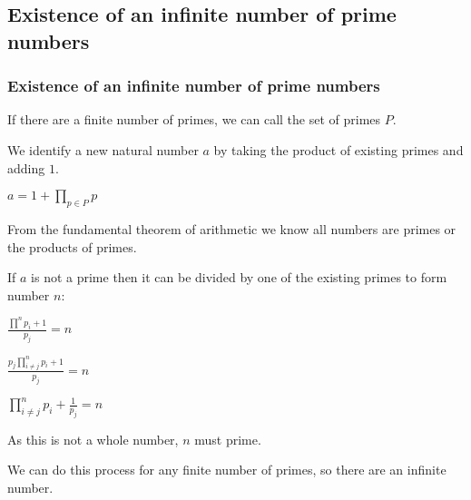 
\subsection{Existence of an infinite number of prime numbers}

\subsubsection{Existence of an infinite number of prime numbers}

If there are a finite number of primes, we can call the set of primes \(P\).

We identify a new natural number \(a\) by taking the product of existing primes and adding \(1\).

\(a=1+\prod_{p\in P} p\)

From the fundamental theorem of arithmetic we know all numbers are primes or the products of primes.

If \(a\) is not a prime then it can be divided by one of the existing primes to form number \(n\):

\(\frac{\prod^n p_i +1}{p_j}=n\)

\(\frac{p_j \prod^n_{i\ne j} p_i +1}{p_j}=n\)

\(\prod^n_{i\ne j} p_i +\frac{1}{p_j}=n\)

As this is not a whole number, \(n\) must prime.

We can do this process for any finite number of primes, so there are an infinite number.

